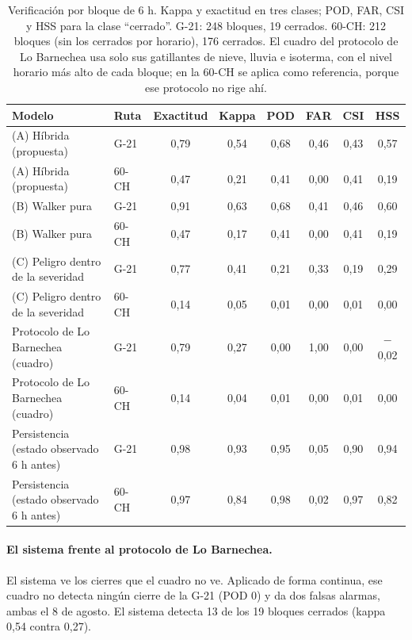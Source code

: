 \begin{table}[H]
\centering\footnotesize\setlength{\tabcolsep}{4pt}
\caption{Verificación por bloque de 6 h. Kappa y exactitud en tres clases; POD, FAR, CSI y HSS para la clase ``cerrado''. G-21: 248 bloques, 19 cerrados. 60-CH: 212 bloques (sin los cerrados por horario), 176 cerrados. El cuadro del protocolo de Lo Barnechea usa solo sus gatillantes de nieve, lluvia e isoterma, con el nivel horario más alto de cada bloque; en la 60-CH se aplica como referencia, porque ese protocolo no rige ahí.}
\label{tab:metricas}
\begin{tabular}{|l|l|c|c|c|c|c|c|}
\hline
Modelo & Ruta & Exactitud & Kappa & POD & FAR & CSI & HSS \\ \hline
(A) Híbrida (propuesta) & G-21 & 0,79 & 0,54 & 0,68 & 0,46 & 0,43 & 0,57 \\ \hline
(A) Híbrida (propuesta) & 60-CH & 0,47 & 0,21 & 0,41 & 0,00 & 0,41 & 0,19 \\ \hline
(B) Walker pura & G-21 & 0,91 & 0,63 & 0,68 & 0,41 & 0,46 & 0,60 \\ \hline
(B) Walker pura & 60-CH & 0,47 & 0,17 & 0,41 & 0,00 & 0,41 & 0,19 \\ \hline
(C) Peligro dentro de la severidad & G-21 & 0,77 & 0,41 & 0,21 & 0,33 & 0,19 & 0,29 \\ \hline
(C) Peligro dentro de la severidad & 60-CH & 0,14 & 0,05 & 0,01 & 0,00 & 0,01 & 0,00 \\ \hline
Protocolo de Lo Barnechea (cuadro) & G-21 & 0,79 & 0,27 & 0,00 & 1,00 & 0,00 & $-$0,02 \\ \hline
Protocolo de Lo Barnechea (cuadro) & 60-CH & 0,14 & 0,04 & 0,01 & 0,00 & 0,01 & 0,00 \\ \hline
Persistencia (estado observado 6 h antes) & G-21 & 0,98 & 0,93 & 0,95 & 0,05 & 0,90 & 0,94 \\ \hline
Persistencia (estado observado 6 h antes) & 60-CH & 0,97 & 0,84 & 0,98 & 0,02 & 0,97 & 0,82 \\ \hline
\end{tabular}
\end{table}

\paragraph{El sistema frente al protocolo de Lo Barnechea.} El sistema ve los cierres que el cuadro no ve. Aplicado de forma continua, ese cuadro no detecta ningún cierre de la G-21 (POD 0) y da dos falsas alarmas, ambas el 8 de agosto. El sistema detecta 13 de los 19 bloques cerrados (kappa 0,54 contra 0,27).

